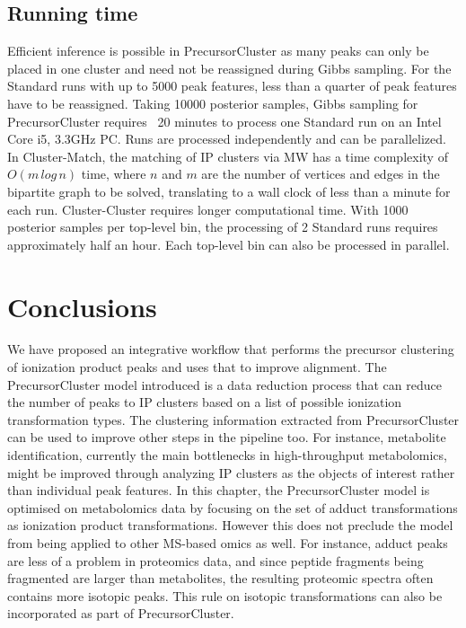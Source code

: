 \subsection{Running time}

Efficient inference is possible in PrecursorCluster as many peaks can only be placed in one cluster and need not be reassigned during Gibbs sampling. For the Standard runs with up to 5000 peak features, less than a quarter of peak features have to be reassigned. Taking 10000 posterior samples, Gibbs sampling for PrecursorCluster requires ~20 minutes to process one Standard run on an Intel Core i5, 3.3GHz PC. Runs are processed independently and can be parallelized. In Cluster-Match, the matching of IP clusters via MW has a time complexity of $O(m\, log\, n)$ time, where $n$ and $m$ are the number of vertices and edges in the bipartite graph to be solved, translating to a wall clock of less than a minute for each run. Cluster-Cluster requires longer computational time. With 1000 posterior samples per top-level bin, the processing of 2 Standard runs requires approximately half an hour. Each top-level bin can also be processed in parallel.

\section{Conclusions}

We have proposed an integrative workflow that performs the precursor clustering of ionization product peaks and uses that to improve alignment. The PrecursorCluster model introduced is a data reduction process that can reduce the number of peaks to IP clusters based on a list of possible ionization transformation types. The clustering information extracted from PrecursorCluster can be used to improve other steps in the pipeline too. For instance, metabolite identification, currently the main bottlenecks in high-throughput metabolomics, might be improved through analyzing IP clusters as the objects of interest rather than individual peak features. In this chapter, the PrecursorCluster model is optimised on metabolomics data by focusing on the set of adduct transformations as ionization product transformations. However this does not preclude the model from being applied to other MS-based omics as well. For instance, adduct peaks are less of a problem in proteomics data, and since peptide fragments being fragmented are larger than metabolites, the resulting proteomic spectra often contains more isotopic peaks. This rule on isotopic transformations can also be incorporated as part of PrecursorCluster. 

